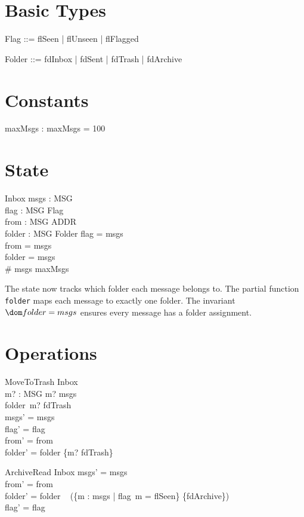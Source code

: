 \documentclass{article}
\begin{document}
\section{Basic Types}

\begin{zed}
\end{zed}

\begin{zed}
  Flag ::= flSeen | flUnseen | flFlagged
\end{zed}

\begin{zed}
  Folder ::= fdInbox | fdSent | fdTrash | fdArchive
\end{zed}

\section{Constants}

\begin{axdef}
  maxMsgs : \nat
\where
  maxMsgs = 100
\end{axdef}

\section{State}

\begin{schema}{Inbox}
  msgs : \power MSG \\
  flag : MSG \pfun Flag \\
  from : MSG \pfun ADDR \\
  folder : MSG \pfun Folder
\where
  \dom flag = msgs \\
  \dom from = msgs \\
  \dom folder = msgs \\
  \# msgs \leq maxMsgs
\end{schema}

The state now tracks which folder each message belongs to.
The partial function \texttt{folder} maps each message to
exactly one folder. The invariant $\dom folder = msgs$
ensures every message has a folder assignment.

\section{Operations}

\begin{schema}{MoveToTrash}
  \Delta Inbox \\
  m? : MSG
\where
  m? \in msgs \\
  folder~m? \neq fdTrash \\
  msgs' = msgs \\
  flag' = flag \\
  from' = from \\
  folder' = folder \oplus \{m? \mapsto fdTrash\}
\end{schema}

\begin{schema}{ArchiveRead}
  \Delta Inbox
\where
  msgs' = msgs \\
  from' = from \\
  folder' = folder \oplus
    \quad~ (\{m : msgs | flag~m = flSeen\} \cross \{fdArchive\}) \\
  flag' = flag
\end{schema}
\end{document}

